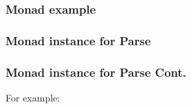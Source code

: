 \documentclass{beamer}
\begin{document}
\begin{frame}
  \frametitle{Monad example}



\end{frame}


\begin{frame}
  \frametitle{Monad instance for Parse}




\end{frame}


\begin{frame}
  \frametitle{Monad instance for Parse Cont.}

  For example:



\end{frame}
\end{document}
